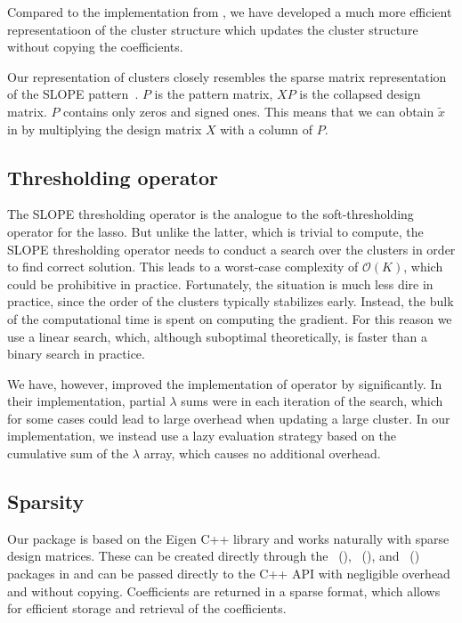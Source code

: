 \documentclass[article]{jss}
\let\Cref\crtCref
\begin{document}
Compared to the implementation from \citet{larsson2023}, we
have developed a much more efficient representatioon of the
cluster structure which updates the cluster structure
without copying the coefficients.

Our representation of clusters closely resembles the sparse matrix
representation of the SLOPE pattern~\citep{schneider2022}. \(P\) is the pattern
matrix, \(X P\) is the collapsed design matrix. \(P\) contains only
zeros and signed ones. This means that we can obtain \(\tilde{x}\) in
\Cref{alg:hybrid} by multiplying the design matrix \(X\) with
a column of \(P\).

\subsection{Thresholding operator}

The SLOPE thresholding operator is the analogue to the
soft-thresholding operator for the lasso. But unlike the
latter, which is trivial to compute, the SLOPE thresholding operator
needs to conduct a search over the clusters in order to find correct
solution. This leads to a worst-case complexity of
\(\mathcal{O}(K)\), which could be prohibitive in practice.
Fortunately, the situation is much less dire in practice, since
the order of the clusters typically stabilizes early. Instead, the
bulk of the computational time is spent on computing the gradient.
For this reason we use a linear search, which, although suboptimal
theoretically, is faster than a binary search in practice.

We have, however, improved the implementation of
operator by \citet{larsson2023} significantly. In their implementation,
partial \(\lambda\) sums were in each iteration of the search, which
for some cases could lead to large overhead when updating
a large cluster. In our implementation, we instead use a lazy
evaluation strategy based on the cumulative sum of the \(\lambda\) array,
which causes no additional overhead.

\subsection{Sparsity}

Our package is based on the Eigen C++ library and works naturally with sparse
design matrices. These can be created directly through the
~(), ~(), and ~() packages in
and can be passed directly to the C++ API with negligible overhead
and without copying. Coefficients are returned in a sparse format, which
allows for efficient storage and retrieval of the coefficients.
\end{document}
